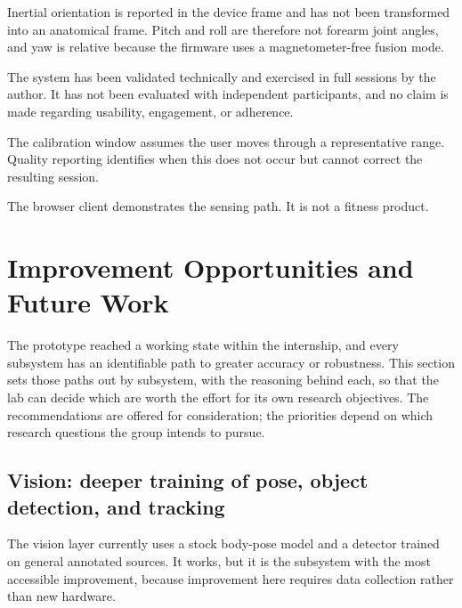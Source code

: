 \documentclass[11pt,a4paper]{article}
\begin{document}
\begin{description}[leftmargin=1.2cm,style=nextline,itemsep=4pt]
\item[Device-frame orientation] Inertial orientation is reported in the device
frame and has not been transformed into an anatomical frame. Pitch and roll are
therefore not forearm joint angles, and yaw is relative because the firmware uses
a magnetometer-free fusion mode.

\item[No participant evaluation] The system has been validated technically and
exercised in full sessions by the author. It has not been evaluated with
independent participants, and no claim is made regarding usability, engagement, or
adherence.

\item[Calibration assumes cooperation] The calibration window assumes the user
moves through a representative range. Quality reporting identifies when this does
not occur but cannot correct the resulting session.

\item[Proof-of-concept application] The browser client demonstrates the sensing
path. It is not a fitness product.
\end{description}

\section{Improvement Opportunities and Future Work}
\label{sec:futurework}

The prototype reached a working state within the internship, and every subsystem
has an identifiable path to greater accuracy or robustness. This section sets
those paths out by subsystem, with the reasoning behind each, so that the lab can
decide which are worth the effort for its own research objectives. The
recommendations are offered for consideration; the priorities depend on which
research questions the group intends to pursue.

\subsection{Vision: deeper training of pose, object detection, and tracking}

The vision layer currently uses a stock body-pose model and a detector trained on
general annotated sources. It works, but it is the subsystem with the most
accessible improvement, because improvement here requires data collection rather
than new hardware.
\end{document}
